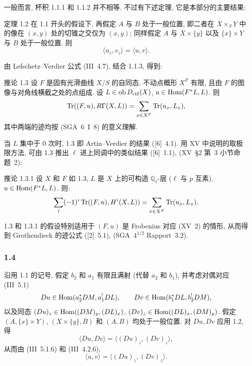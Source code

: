 一般而言, 杯积 1.1.1 和 1.1.2 并不相等. 不过有下述定理, 它是本部分的主要结果:

\begin{statement}{定理 1.2}
在 1.1 开头的假设下, 再假定 $A$ 与 $B$ 处于一般位置, 即二者在 $X\times_S Y$ 中的像在 $(x,y)$ 处的切锥之交仅为 $(x,y)$; 同样假定 $A$ 与 $X\times\{y\}$ 以及 $\{x\}\times Y$ 与 $B$ 处于一般位置. 则
\begin{equation}\tag{1.2.1}
\langle u_z,v_z\rangle=\langle u,v\rangle.
\end{equation}
\end{statement}

由 Lefschetz--Verdier 公式 (III~4.7), 结合 1.1.3, 得到:

\begin{statement}{推论 1.3}
设 $F$ 是固有光滑曲线 $X/S$ 的自同态, 不动点概形 $X^F$ 有限, 且由 $F$ 的图像与对角线横截之处的点组成. 设 $L\in\operatorname{ob} D_{\mathrm{ctf}}(X)$, $u\in\operatorname{Hom}(F^*L,L)$. 则
\[
\operatorname{Tr}((F,u),R\Gamma(X,L))=\sum_{x\in X^F}\operatorname{Tr}(u_x,L_x),
\]
其中两端的迹均按 (SGA~6~I~8) 的意义理解.
\end{statement}

当 $L$ 集中于 $0$ 次时, 1.3 即 Artin--Verdier 的结果 ([6]~4.1). 用 XV 中说明的取极限方法, 可由 1.3 推出 $\ell$ 进上同调中的类似结果 ([6]~1.1), (XV~\S2 第~3 小节命题~2):

\begin{statement}{推论 1.3.1}
设 $X$ 和 $F$ 如 1.3, $L$ 是 $X$ 上的可构造 $\mathbb Q_\ell$-层 ($\ell$ 与 $p$ 互素), $u\in\operatorname{Hom}(F^*L,L)$. 则:
\[
\sum_i(-1)^i\operatorname{Tr}((F,u),H^i(X,L))=\sum_{x\in X^F}\operatorname{Tr}(u_x,L_x).
\]
\end{statement}

1.3 和 1.3.1 的假设特别适用于 $(F,u)$ 是 Frobenius 对应 (XV~2) 的情形, 从而得到 Groth\-endieck 的迹公式 ([2]~5.1), (SGA~$4^{1/2}$ Rapport~3.2).

\subsubsection*{1.4}
沿用 1.1 的记号, 假定 $b_2$ 和 $a_1$ 有限且满射 (代替 $a_2$ 和 $b_1$), 并考虑对偶对应 (III~5.1)
\[
Du\in\operatorname{Hom}(a_2^*DM,a_1^!DL),\qquad Dv\in\operatorname{Hom}(b_1^*DL,b_2^!DM),
\]
以及同态 $(Du)_z\in\operatorname{Hom}((DM)_y,(DL)_x)$, $(Dv)_z\in\operatorname{Hom}((DL)_x,(DM)_y)$. 假定 $(A,\{x\}\times Y)$, $(X\times\{y\},B)$ 和 $(A,B)$ 均处于一般位置. 对 $Du,Dv$ 应用 1.2, 得
\[
\langle Du,Dv\rangle=\langle (Du)_z,(Dv)_z\rangle,
\]
从而由 (III~5.1.6) 和 (III~4.2.6),
\begin{equation}\tag{1.4.1}
\langle u,v\rangle=\langle (Du)_z,(Dv)_z\rangle.
\end{equation}

